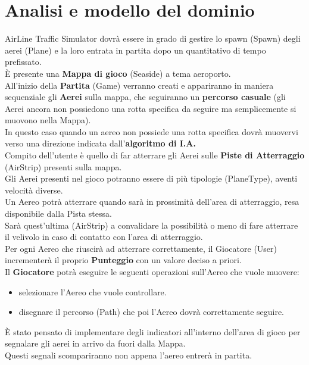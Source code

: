 \documentclass[a4paper,12pt]{report}
\begin{document}
\section{Analisi e modello del dominio}
AirLine Traffic Simulator dovrà essere in grado di gestire lo spawn (Spawn) degli aerei (Plane) e la loro entrata in partita dopo un quantitativo di tempo prefissato. 
\\
È presente una \textbf{Mappa di gioco} (Seaside) a tema aeroporto.
\\	
All’inizio della \textbf{Partita} (Game) verranno creati e appariranno in maniera sequenziale gli \textbf{Aerei} sulla mappa, che seguiranno un \textbf{percorso casuale} (gli Aerei ancora non possiedono una rotta specifica da seguire ma semplicemente si muovono nella Mappa). 
\\
In questo caso quando un aereo non possiede una rotta specifica dovrà muovervi verso una direzione indicata dall’\textbf{algoritmo di I.A.}
\\
Compito dell’utente è quello di far atterrare gli Aerei sulle \textbf{Piste di Atterraggio} (AirStrip) presenti sulla mappa.
\\
Gli Aerei presenti nel gioco potranno essere di più tipologie (PlaneType), aventi velocità diverse.
\\
Un Aereo potrà atterrare quando sarà in prossimità dell’area di atterraggio, resa disponibile dalla Pista stessa.
\\
Sarà quest’ultima (AirStrip) a convalidare la possibilità o meno di fare atterrare il velivolo in caso di contatto con l'area di atterraggio.
\\
Per ogni Aereo che riuscirà ad atterrare correttamente, il Giocatore (User) incrementerà il proprio \textbf{Punteggio} con un valore deciso a priori.
\\
Il \textbf{Giocatore} potrà eseguire le seguenti operazioni sull’Aereo che vuole muovere:
\begin{itemize}
    \item selezionare l’Aereo che vuole controllare.
	\item disegnare il percorso (Path) che poi l'Aereo dovrà correttamente seguire.
\end{itemize}

\noindent È stato pensato di implementare degli indicatori all’interno dell'area di gioco per segnalare gli aerei in arrivo da fuori dalla Mappa.
\\
Questi segnali scompariranno non appena l’aereo entrerà in partita.
\end{document}
